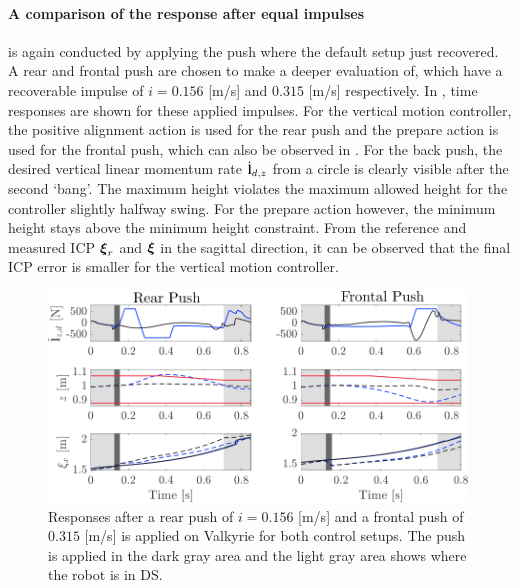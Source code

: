 \paragraph{A comparison of the response after equal impulses} is again conducted by applying the push where the default setup just recovered. A rear and frontal push are chosen to make a deeper evaluation of, which have a recoverable impulse of $i=0.156$ [m/s] and $0.315$ [m/s] respectively. In , time responses are shown for these applied impulses. For the vertical motion controller, the positive alignment action is used for the rear push and the prepare action is used for the frontal push, which can also be observed in . For the back push, the desired vertical linear momentum rate $\dot{\mathbf{l}}_{d,z}$ from a circle is clearly visible after the second `bang'. The maximum height violates the maximum allowed height for the controller slightly halfway swing. For the prepare action however, the minimum height stays above the minimum height constraint. From the reference and measured \ac{ICP} $\boldsymbol{\xi}_r$ and $\boldsymbol{\xi}$ in the sagittal direction, it can be observed that the final \ac{ICP} error is smaller for the vertical motion controller.
\begin{figure}
     \centering
        \includegraphics[width=0.99\textwidth]{STYLESTUFF/walkplot.png}
    \caption{Responses after a rear push of $i=0.156$ [m/s] and a frontal push of $0.315$ [m/s] is applied on Valkyrie for both control setups. The push is applied in the dark gray area and the light gray area shows where the robot is in \ac{DS}.}
    \label{fig:walkplot}
\end{figure}


